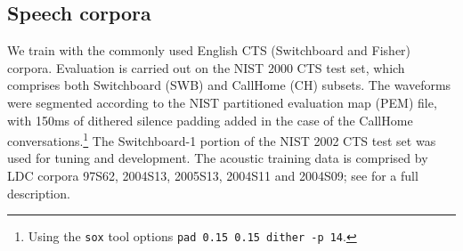 \documentclass{article}
\begin{document}
\subsection{Speech corpora}
We train with the commonly used English CTS (Switchboard and Fisher) corpora.
Evaluation is carried out on the NIST 2000 CTS test set, which comprises both Switchboard (SWB) and CallHome (CH)
subsets.
The waveforms were segmented according to the NIST partitioned evaluation map (PEM) file,
with 150ms of dithered silence padding added in the case of the CallHome conversations.\footnote{Using the {\tt sox} tool options {\tt pad 0.15 0.15 dither -p 14}.}
The Switchboard-1 portion of the NIST 2002 CTS test set was used for tuning and development.
The acoustic training data is comprised by LDC corpora 97S62, 2004S13, 2005S13,
2004S11 and 2004S09; see \cite{chen2006advances} for a full description.
\end{document}
